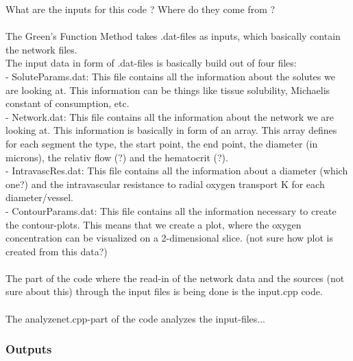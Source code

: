 What are the inputs for this code ? Where do they come from ?
\\
\\The Green's Function Method takes .dat-files as inputs, which basically contain the network files.
\\
The input data in form of .dat-files is basically build out of four files:
\\- SoluteParams.dat: This file contains all the information about the solutes we are looking at. This information can be things like tissue solubility, Michaelis constant of consumption, etc.
\\- Network.dat: This file contains all the information about the network we are looking at. This information is basically in form of an array. This array defines for each segment the type, the start point, the end point, the diameter (in microns), the relativ flow (?) and the hematocrit (?).
\\- IntravascRes.dat: This file contains all the information about a diameter (which one?) and the intravascular resistance to radial oxygen transport K for each diameter/vessel.
\\- ContourParams.dat: This file contains all the information necessary to create the contour-plots. This means that we create a plot, where the oxygen concentration can be visualized on a 2-dimensional slice. (not sure how plot is created from this data?)
\\
\\The part of the code where the read-in of the network data and the sources (not sure about this) through the input files is being done is the input.cpp code.
\\
\\The analyzenet.cpp-part of the code analyzes the input-files...

\subsubsection*{Outputs}

